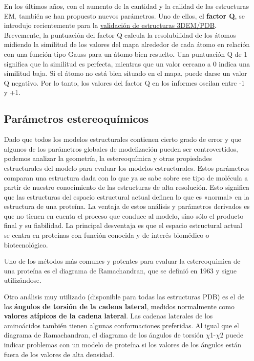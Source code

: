 En los últimos años, con el aumento de la cantidad y la calidad de las estructuras EM, también se han propuesto nuevos parámetros. Uno de ellos, el \textbf{factor Q}, se introdujo recientemente para la \href{https://www.rcsb.org/news/feature/62de9e5235ec5bb4ddb19a43}{validación de estructuras 3DEM/PDB}. Brevemente, la puntuación del factor Q calcula la resolubilidad de los átomos midiendo la similitud de los valores del mapa alrededor de cada átomo en relación con una función tipo Gauss para un átomo bien resuelto. Una puntuación Q de 1 significa que la similitud es perfecta, mientras que un valor cercano a 0 indica una similitud baja. Si el átomo no está bien situado en el mapa, puede darse un valor Q negativo. Por lo tanto, los valores del factor Q en los informes oscilan entre -1 y +1.

\subsection{Parámetros estereoquímicos}
Dado que todos los modelos estructurales contienen cierto grado de error y que algunos de los parámetros globales de modelización pueden ser controvertidos, podemos analizar la geometría, la estereoquímica y otras propiedades estructurales del modelo para evaluar los modelos estructurales. Estos parámetros comparan una estructura dada con lo que ya se sabe sobre ese tipo de molécula a partir de nuestro conocimiento de las estructuras de alta resolución. Esto significa que las estructuras del espacio estructural actual definen lo que es «normal» en la estructura de una proteína. La ventaja de estos análisis y parámetros derivados es que no tienen en cuenta el proceso que conduce al modelo, sino sólo el producto final y su fiabilidad. La principal desventaja es que el espacio estructural actual se centra en proteínas con función conocida y de interés biomédico o biotecnológico.

Uno de los métodos más comunes y potentes para evaluar la estereoquímica de una proteína es el diagrama de Ramachandran, que se definió en 1963 y sigue utilizándose.

Otro análisis muy utilizado (disponible para todas las estructuras PDB) es el de los \textbf{ángulos de torsión de la cadena lateral}, medidos normalmente como \textbf{valores atípicos de la cadena lateral}. Las cadenas laterales de los aminoácidos también tienen algunas conformaciones preferidas. Al igual que el diagrama de Ramachandran, el diagrama de los ángulos de torsión $\chi$1-$\chi$2 puede indicar problemas con un modelo de proteína si los valores de los ángulos están fuera de los valores de alta densidad.

